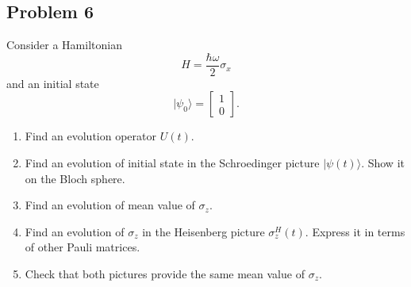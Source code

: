 \documentclass[a4paper,10pt]{article}
\newcommand{\ket}[1]{|#1\rangle}
\newcommand{\bra}[1]{\langle#1|}
\begin{document}
\subsection*{Problem 6}
Consider a Hamiltonian
\begin{equation}
	H = \frac{\hbar \omega}{2} \sigma_x
\end{equation}
and an initial state
\begin{equation}
	\ket{\psi_0} = \begin{bmatrix}
		1 \\ 0
	\end{bmatrix}.
\end{equation}
\begin{enumerate}
	\item Find an evolution operator $U(t)$.
	\item Find an evolution of initial state in the Schroedinger picture $\ket{\psi(t)}$. Show it on the Bloch sphere.
	\item Find an evolution of mean value of $\sigma_z$.
	\item Find an evolution of $\sigma_z$ in the Heisenberg picture $\sigma_z^H(t)$. Express it in terms of other Pauli matrices. 
	\item Check that both pictures provide the same mean value of $\sigma_z$.
\end{enumerate}

\iffalse
\subsection*{Problem 5}
Let
\begin{equation}
	\rho = \begin{bmatrix}
		\rho_{00} & \rho_{01} & \rho_{02} & \rho_{03} \\
		\rho_{10} & \rho_{11} & \rho_{12} & \rho_{13} \\
		\rho_{20} & \rho_{21} & \rho_{22} & \rho_{23} \\
		\rho_{30} & \rho_{31} & \rho_{32} & \rho_{33} \\
	\end{bmatrix}
\end{equation}
be a two-qubit density matrix.
\begin{enumerate}
	\item Check that $\bra{i,j=0}^{d}\rho\ket{k,l}=\rho_{{\rm bin}(i,j){\rm bin}(k,l)}$
\end{enumerate}
\fi 
\end{document}
